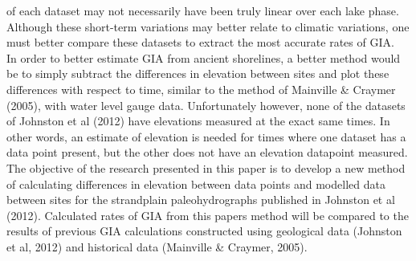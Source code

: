 \documentclass{article}
\begin{document}
 of each dataset may not necessarily have been truly linear over each lake phase.
 Although these short-term variations may better relate to climatic variations,
 one must better compare these datasets to extract the most accurate rates of GIA.
  \\
 In order to better estimate GIA from ancient shorelines, a better method would be to simply subtract
 the differences in elevation between sites and plot these differences with
 respect to time, similar to the method of Mainville \& Craymer (2005), with
 water level gauge data. Unfortunately however, none of the datasets of Johnston
 et al (2012) have elevations
 measured at the exact same times. In other words, an estimate of elevation is needed for times where
 one dataset
 has a data point present, but the other does not have an elevation datapoint measured.
 The objective of the research presented in this paper is to develop a new method
 of calculating differences
 in elevation between data points and modelled data between sites for the
 strandplain paleohydrographs published in Johnston et al (2012). Calculated rates
 of GIA from this papers method will be compared to the results of previous GIA
 calculations constructed using geological data (Johnston et al, 2012) and
 historical data (Mainville \& Craymer, 2005). \\

 
\end{document}
